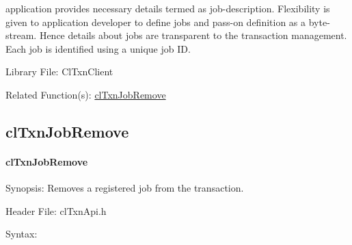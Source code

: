 \begin{flushleft}
\begin{Desc}
application provides necessary details termed as job-description. Flexibility is given to application developer to define jobs and pass-on definition as 
a byte-stream. Hence details about jobs are transparent to the transaction management. Each job is identified using a unique job ID.\end{Desc}
\begin{Desc}
\item[Library File:]Cl\-Txn\-Client\end{Desc}
\begin{Desc}
\item[Related Function(s):]\hyperlink{pagetxn108}{cl\-Txn\-Job\-Remove} \end{Desc}
\newpage


\subsection{clTxnJobRemove}
\hypertarget{pagetxn108}{}\paragraph{cl\-Txn\-Job\-Remove}\label{pagetxn108}
\begin{Desc}
\item[Synopsis:]Removes a registered job from the transaction.\end{Desc}
\begin{Desc}
\item[Header File:]clTxnApi.h\end{Desc}
\begin{Desc}
\item[Syntax:]


\end{Desc}
\end{flushleft}
